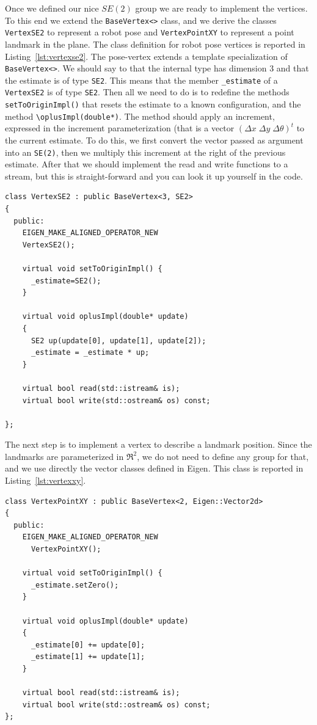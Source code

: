 \documentclass[a4paper]{article}
\begin{document}
Once we defined our nice $SE(2)$ group we are ready to implement the
vertices.  To this end we extend the \verb+BaseVertex<>+ class, and we
derive the classes \verb+VertexSE2+ to represent a robot pose and
\verb+VertexPointXY+ to represent a point landmark in the plane.
The class definition for robot pose vertices is reported in
Listing~\ref{lst:vertexse2}.
The pose-vertex extends a template specialization of
\verb+BaseVertex<>+.  We should say to \gopt{} that the internal type
has dimension 3 and that the estimate is of type \verb+SE2+. This
means that the member \verb+_estimate+ of a \verb+VertexSE2+ is of
type \verb+SE2+.  Then all we need to do is to redefine the methods
\verb+setToOriginImpl()+ that resets the estimate to a known
configuration, and the method \verb+\oplusImpl(double*)+.  The method
should apply an increment, expressed in the increment parameterization
(that is a vector $(\Delta x \; \Delta y \; \Delta \theta )^t$ to the
current estimate.  To do this, we first convert the vector passed as
argument into an \verb+SE(2)+, then we multiply this increment at the
right of the previous estimate.  After that we should implement the
read and write functions to a stream, but this is straight-forward and
you can look it up yourself in the code.

\begin{lstlisting}[float,label=lst:vertexse2,caption=Vertex representing
  a 2D robot pose]
class VertexSE2 : public BaseVertex<3, SE2>
{
  public:
    EIGEN_MAKE_ALIGNED_OPERATOR_NEW
    VertexSE2();

    virtual void setToOriginImpl() {
      _estimate=SE2();
    }

    virtual void oplusImpl(double* update)
    {
      SE2 up(update[0], update[1], update[2]);
      _estimate = _estimate * up;
    }

    virtual bool read(std::istream& is);
    virtual bool write(std::ostream& os) const;

};
\end{lstlisting}
The next step is to implement a vertex to describe a landmark
position.  Since the landmarks are parameterized in $\Re^2$, we do not
need to define any group for that, and we use directly the vector
classes defined in Eigen. This class is reported in Listing~\ref{lst:vertexxy}.

\begin{lstlisting}[float,label=lst:vertexxy,caption=Vertex representing
  a 2D landmark]
class VertexPointXY : public BaseVertex<2, Eigen::Vector2d>
{
  public:
    EIGEN_MAKE_ALIGNED_OPERATOR_NEW
      VertexPointXY();

    virtual void setToOriginImpl() {
      _estimate.setZero();
    }

    virtual void oplusImpl(double* update)
    {
      _estimate[0] += update[0];
      _estimate[1] += update[1];
    }

    virtual bool read(std::istream& is);
    virtual bool write(std::ostream& os) const;
};
\end{lstlisting}
\end{document}
